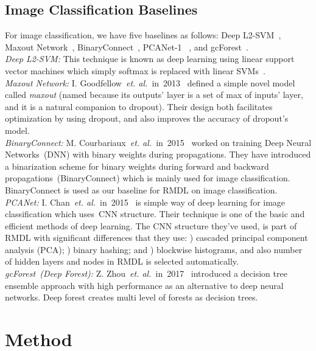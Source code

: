\documentclass[sigconf, final]{acmart}
\begin{document}
\subsection{Image Classification Baselines}\label{subsec:baseline_image}
For image classification, we have five baselines as follows: Deep L2-SVM~\cite{tang2013deep}, Maxout Network~\cite{goodfellow2013maxout}, BinaryConnect~\cite{courbariaux2015binaryconnect}, PCANet-1 ~\cite{chan2015pcanet}, and gcForest~\cite{zhou2017deep}.\\
\textit{Deep L2-SVM:} This technique is known as deep learning using linear support vector machines which simply softmax is replaced with linear SVMs~\cite{tang2013deep}.
\\ \textit{Maxout Network:} I. Goodfellow~\textit{et. al.}~in~2013~\cite{goodfellow2013maxout} defined a simple novel model called \textit{maxout} (named because its outputs' layer is a set of max of inputs' layer, and it is a natural companion to dropout). Their design both facilitates optimization by using dropout, and also improves the accuracy of dropout's model.\\
\textit{BinaryConnect:} M. Courbariaux~\textit{et. al.}~in~2015~\cite{courbariaux2015binaryconnect} worked on training Deep Neural Networks~(DNN) with binary weights during propagations. They have introduced a binarization scheme for binary weights during forward and backward propagations~(\textup{BinaryConnect}) which is mainly used for image classification. BinaryConnect is used as our baseline for RMDL on image classification.\\ \textit{PCANet:} I. Chan~\textit{et. al.}~in~2015~\cite{chan2015pcanet} is simple way of deep learning for image classification which uses~CNN structure. Their technique is one of the basic and efficient methods of deep learning. The CNN structure they've used, is part of RMDL with significant differences that they use: ) cascaded principal component analysis (PCA); ) binary hashing; and  ) blockwise histograms, and also number of hidden layers and nodes in RMDL is selected automatically.\\ \textit{gcForest~(Deep Forest):} Z. Zhou~\textit{et. al.}~in~2017~\cite{zhou2017deep} introduced a decision tree ensemble approach with high performance as an alternative to deep neural networks. Deep forest creates multi level of forests as decision trees.  



\section{Method}\label{method}\label{sec:method}
\end{document}
